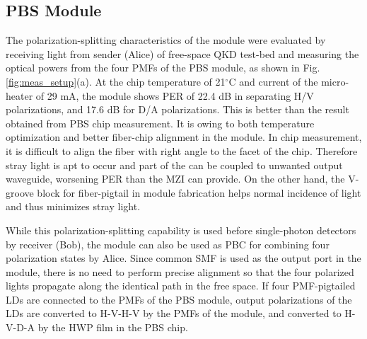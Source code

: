 \documentclass[letterpaper, 10pt]{article}
\begin{document}
\subsection{PBS Module}
The polarization-splitting characteristics of the module were evaluated by receiving light from sender (Alice) of free-space QKD test-bed and measuring the optical powers from the four PMFs of the PBS module, as shown in Fig. \ref{fig:meas_setup}(a).
At the chip temperature of 21$^\circ$C and current of the micro-heater of 29 mA, the module shows PER of 22.4 dB in separating H/V polarizations, and 17.6 dB for D/A polarizations.
This is better than the result obtained from PBS chip measurement.
It is owing to both temperature optimization and better fiber-chip alignment in the module.
In chip measurement, it is difficult to align the fiber with right angle to the facet of the chip.
Therefore stray light is apt to occur and part of the can be coupled to unwanted output waveguide, worsening PER than the MZI can provide.
On the other hand, the V-groove block for fiber-pigtail in module fabrication helps normal incidence of light and thus minimizes stray light.

While this polarization-splitting capability is used before single-photon detectors by receiver (Bob), the module can also be used as PBC for combining four polarization states by Alice.
Since common SMF is used as the output port in the module, there is no need to perform precise alignment so that the four polarized lights propagate along the identical path in the free space.
If four PMF-pigtailed LDs are connected to the PMFs of the PBS module, output polarizations of the LDs are converted to H-V-H-V  by the PMFs of the module, and converted to  H-V-D-A  by the HWP film in the PBS chip.
\end{document}
